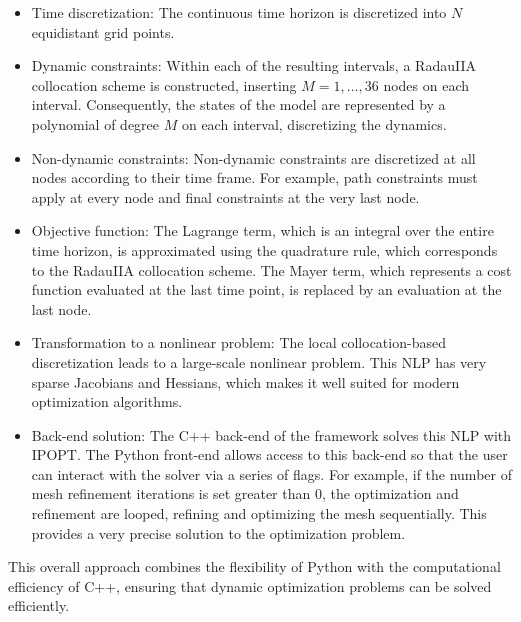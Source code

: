 \documentclass[12pt]{article}
\begin{document}
\begin{itemize}

	\item Time discretization:
	      The continuous time horizon is discretized into $N$ equidistant grid
	      points.

	\item {Dynamic constraints}:
	      Within each of the resulting intervals, a RadauIIA collocation scheme
	      is constructed, inserting $M = 1, \ldots, 36$ nodes on each interval.
	      Consequently, the states of the model are represented by a polynomial of degree
	      $M$ on each interval, discretizing the dynamics.

	\item {Non-dynamic constraints}:
	      Non-dynamic constraints are discretized at all nodes according to their
	      time frame. For example, path constraints must apply at every node and final
	      constraints at the very last node.

	\item {Objective function}:
	      The Lagrange term, which is an integral over the entire time horizon,
	      is approximated using the quadrature rule, which corresponds to the RadauIIA
	      collocation scheme.
	      The Mayer term, which represents a cost function evaluated at the last
	      time point, is replaced by an evaluation at the last node.

	\item {Transformation to a nonlinear problem}:
	      The local collocation-based discretization leads to a large-scale
	      nonlinear problem. This NLP has very sparse Jacobians and Hessians, which makes
	      it well suited for modern optimization algorithms.

	\item {Back-end solution}:
	      The C++ back-end of the framework solves this NLP with IPOPT. The
	      Python front-end allows access to this back-end so that the user can interact
	      with the solver via a series of flags. For example, if the number of mesh
	      refinement iterations is set greater than 0, the optimization and refinement
	      are looped, refining and optimizing the mesh sequentially. This provides a very
	      precise solution to the optimization problem.

\end{itemize}
This overall approach combines the flexibility of Python with the computational
efficiency of C++, ensuring that dynamic optimization problems can be solved
efficiently.
\end{document}
